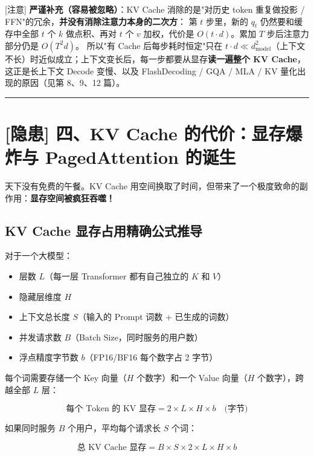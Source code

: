 \begin{warningBox}[避坑指南与核心警示]
{}[注意] \textbf{严谨补充（容易被忽略）}：KV Cache 消除的是"对历史 token 重复做投影 / FFN"的冗余，\textbf{并没有消除注意力本身的二次方}：
第 $t$ 步里，新的 $q_t$ 仍然要和缓存中全部 $t$ 个 $k$ 做点积、再对 $t$ 个 $v$ 加权，代价是 $O(t \cdot d)$。累加 $T$ 步后注意力部分仍是 $O(T^2 d)$。
所以"有 Cache 后每步耗时恒定"只在 $t \cdot d \ll d_{\text{model}}^2$（上下文不长）时近似成立；上下文变长后，每一步都要从显存\textbf{读一遍整个 KV Cache}，这正是长上下文 Decode 变慢、以及 FlashDecoding / GQA / MLA / KV 量化出现的原因（见第 8、9、12 篇）。
\end{warningBox}

\vspace{0.8em}\hrule\vspace{0.8em}

\section{[隐患] 四、KV Cache 的代价：显存爆炸与 PagedAttention 的诞生}

天下没有免费的午餐。KV Cache 用空间换取了时间，但带来了一个极度致命的副作用：\textbf{显存空间被疯狂吞噬！}

\subsection{KV Cache 显存占用精确公式推导}

对于一个大模型：
\begin{itemize}
  \item 层数 $L$（每一层 Transformer 都有自己独立的 $K$ 和 $V$）
  \item 隐藏层维度 $H$
  \item 上下文总长度 $S$（输入的 Prompt 词数 + 已生成的词数）
  \item 并发请求数 $B$（Batch Size，同时服务的用户数）
  \item 浮点精度字节数 $b$（FP16/BF16 每个数字占 2 字节）
\end{itemize}

每个词需要存储一个 Key 向量（$H$ 个数字）和一个 Value 向量（$H$ 个数字），跨越全部 $L$ 层：

\[
\text{每个 Token 的 KV 显存} = 2 \times L \times H \times b \quad \text{(字节)}
\]

如果同时服务 $B$ 个用户，平均每个请求长 $S$ 个词：

\[
\text{总 KV Cache 显存} = B \times S \times 2 \times L \times H \times b
\]

